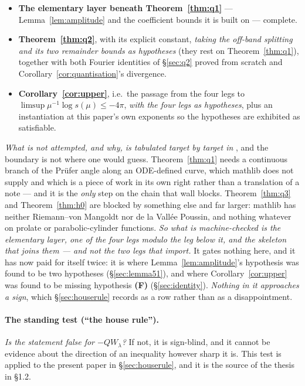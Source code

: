 \documentclass[11pt,a4paper]{article}
\theoremstyle{plain}
\theoremstyle{definition}
\theoremstyle{remark}
\newcommand{\R}{\mathbb{R}}
\newcommand{\Z}{\mathbb{Z}}
\newcommand{\Q}{\mathbb{Q}}
\newcommand{\A}{\mathbb{A}}
\newcommand{\E}{\mathcal{E}}
\newcommand{\F}{\mathcal{F}}
\newcommand{\QW}{QW}
\newcommand{\file}[1]{\path{#1}}
\def\QW{QW}\def\E{E}\def\F{F}\def\R{R}\def\Q{Q}\def\Z{Z}\def\A{A}%
\begin{document}
\begin{itemize}\itemsep2pt
\item \textbf{The elementary layer beneath Theorem~\ref{thm:q1}} ---
Lemma~\ref{lem:amplitude} and the coefficient bounds it is built on --- complete.
\item \textbf{Theorem~\ref{thm:q2}}, with its explicit constant, \emph{taking the
off-band splitting and its two remainder bounds as hypotheses} (they rest on
Theorem~\ref{thm:q1}), together with both Fourier identities of
\S\ref{sec:q2} proved from scratch and Corollary~\ref{cor:quantisation}'s
divergence.
\item \textbf{Corollary~\ref{cor:upper}}, i.e.\ the passage from the four legs to
$\limsup\mu^{-1}\log s(\mu)\le-4\pi$, \emph{with the four legs as hypotheses},
plus an instantiation at this paper's own exponents so the hypotheses are
exhibited as satisfiable.
\end{itemize}

\noindent\emph{What is not attempted, and why, is tabulated target by target in
\file{lean/README.md}}, and the boundary is not where one would guess.
Theorem~\ref{thm:q1} needs a continuous branch of the Pr\"ufer angle along an
ODE-defined curve, which mathlib does not supply and which is a piece of work in
its own right rather than a translation of a note --- and it is the \emph{only}
step on the chain that wall blocks.  Theorem~\ref{thm:q3} and
Theorem~\ref{thm:h0} are blocked by something else and far larger: mathlib has
neither Riemann--von Mangoldt nor de la Vall\'ee Poussin, and nothing whatever on
prolate or parabolic-cylinder functions.  \emph{So what is machine-checked is the
elementary layer, one of the four legs modulo the leg below it, and the skeleton
that joins them --- and not the two legs that import.}  It gates nothing here,
and it has now paid for itself twice: it is where
Lemma~\ref{lem:amplitude}'s hypothesis was found to be two hypotheses
(\S\ref{sec:lemma51}), and where Corollary~\ref{cor:upper} was found to be
missing hypothesis \textbf{(F)} (\S\ref{sec:identity}).  \emph{Nothing in it
approaches a sign}, which \S\ref{sec:houserule} records as a row rather than as
a disappointment.

\paragraph{The standing test (``the house rule'').}  \emph{Is the statement
false for $-\QW_\lambda$?}  If not, it is sign-blind, and it cannot be evidence
about the direction of an inequality however sharp it is.  This test is applied
to the present paper in \S\ref{sec:houserule}, and it is the source of the
thesis in \S1.2.
\end{document}

